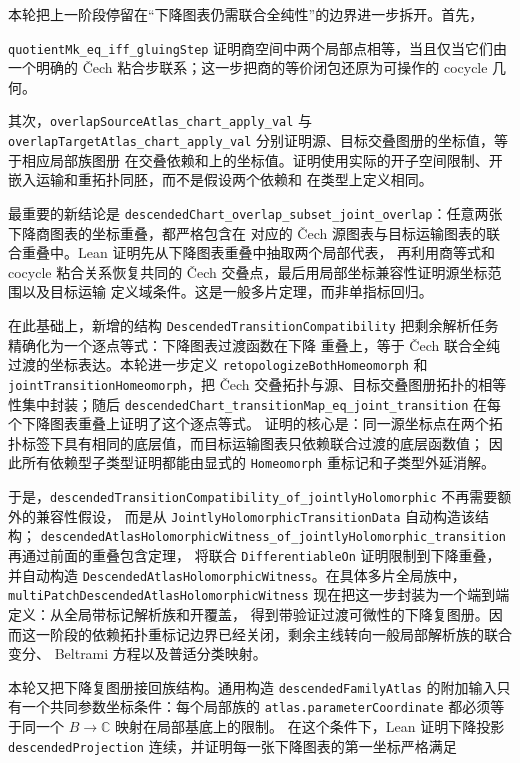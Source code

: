 \documentclass[UTF8,fontset=none,a4paper,11pt]{ctexart}
\begin{document}
本轮把上一阶段停留在“下降图表仍需联合全纯性”的边界进一步拆开。首先，
\par\texttt{quotientMk\_eq\_iff\_gluing\allowbreak Step} 证明商空间中两个局部点相等，当且仅当它们由一个明确的
Čech 粘合步联系；这一步把商的等价闭包还原为可操作的 cocycle 几何。

其次，\texttt{overlapSourceAtlas\_chart\_apply\_val} 与
\texttt{overlapTargetAtlas\_chart\_apply\_val} 分别证明源、目标交叠图册的坐标值，等于相应局部族图册
在交叠依赖和上的坐标值。证明使用实际的开子空间限制、开嵌入运输和重拓扑同胚，而不是假设两个依赖和
在类型上定义相同。

最重要的新结论是
\texttt{descendedChart\_overlap\_subset\_joint\_overlap}：任意两张下降商图表的坐标重叠，都严格包含在
对应的 Čech 源图表与目标运输图表的联合重叠中。Lean 证明先从下降图表重叠中抽取两个局部代表，
再利用商等式和 cocycle 粘合关系恢复共同的 Čech 交叠点，最后用局部坐标兼容性证明源坐标范围以及目标运输
定义域条件。这是一般多片定理，而非单指标回归。

在此基础上，新增的结构
\texttt{DescendedTransitionCompatibility} 把剩余解析任务精确化为一个逐点等式：下降图表过渡函数在下降
重叠上，等于 Čech 联合全纯过渡的坐标表达。本轮进一步定义
\texttt{retopologizeBothHomeomorph} 和
\texttt{jointTransitionHomeomorph}，把 Čech 交叠拓扑与源、目标交叠图册拓扑的相等性集中封装；随后
\texttt{descendedChart\_transitionMap\_eq\_joint\allowbreak\_transition} 在每个下降图表重叠上证明了这个逐点等式。
证明的核心是：同一源坐标点在两个拓扑标签下具有相同的底层值，而目标运输图表只依赖联合过渡的底层函数值；
因此所有依赖型子类型证明都能由显式的 \texttt{Homeomorph} 重标记和子类型外延消解。

于是，\texttt{descendedTransitionCompatibility\allowbreak\_of\allowbreak\_jointlyHolomorphic} 不再需要额外的兼容性假设，
而是从 \texttt{JointlyHolomorphicTransitionData} 自动构造该结构；
\texttt{descendedAtlasHolomorphicWitness\_of\_jointlyHolomorphic\_transition} 再通过前面的重叠包含定理，
将联合 \texttt{DifferentiableOn} 证明限制到下降重叠，并自动构造
\texttt{DescendedAtlas\allowbreak Holomorphic\allowbreak Witness}。在具体多片全局族中，
\texttt{multiPatchDescendedAtlasHolomorphicWitness} 现在把这一步封装为一个端到端定义：从全局带标记解析族和开覆盖，
得到带验证过渡可微性的下降复图册。因而这一阶段的依赖拓扑重标记边界已经关闭，剩余主线转向一般局部解析族的联合变分、
Beltrami 方程以及普适分类映射。

本轮又把下降复图册接回族结构。通用构造
\texttt{descendedFamilyAtlas} 的附加输入只有一个共同参数坐标条件：每个局部族的
\texttt{atlas.parameterCoordinate} 都必须等于同一个 \(B\to\mathbb C\) 映射在局部基底上的限制。
在这个条件下，Lean 证明下降投影 \texttt{descendedProjection} 连续，并证明每一张下降图表的第一坐标严格满足
\end{document}

